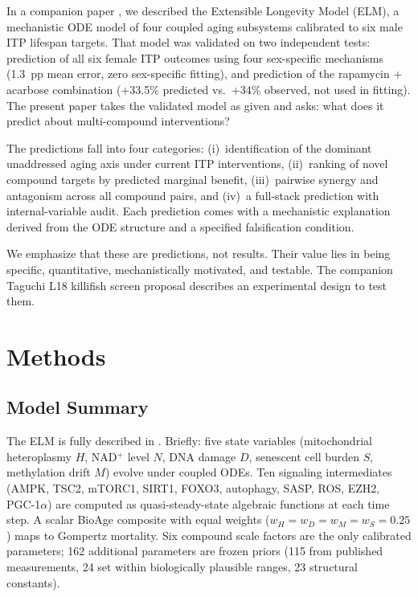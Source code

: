 \documentclass[11pt]{article}
\begin{document}
In a companion paper \citep{Biggs2025elm}, we described the Extensible Longevity Model (ELM), a mechanistic ODE model of four coupled aging subsystems calibrated to six male ITP lifespan targets. That model was validated on two independent tests: prediction of all six female ITP outcomes using four sex-specific mechanisms (1.3~pp mean error, zero sex-specific fitting), and prediction of the rapamycin + acarbose combination (+33.5\% predicted vs.\ +34\% observed, not used in fitting). The present paper takes the validated model as given and asks: what does it predict about multi-compound interventions?

The predictions fall into four categories: (i)~identification of the dominant unaddressed aging axis under current ITP interventions, (ii)~ranking of novel compound targets by predicted marginal benefit, (iii)~pairwise synergy and antagonism across all compound pairs, and (iv)~a full-stack prediction with internal-variable audit. Each prediction comes with a mechanistic explanation derived from the ODE structure and a specified falsification condition.

We emphasize that these are predictions, not results. Their value lies in being specific, quantitative, mechanistically motivated, and testable. The companion Taguchi L18 killifish screen proposal \citep{Biggs2025taguchi} describes an experimental design to test them.

\section{Methods}

\subsection{Model Summary}

The ELM is fully described in \citet{Biggs2025elm}. Briefly: five state variables (mitochondrial heteroplasmy $H$, NAD$^+$ level $N$, DNA damage $D$, senescent cell burden $S$, methylation drift $M$) evolve under coupled ODEs. Ten signaling intermediates (AMPK, TSC2, mTORC1, SIRT1, FOXO3, autophagy, SASP, ROS, EZH2, PGC-1$\alpha$) are computed as quasi-steady-state algebraic functions at each time step. A scalar BioAge composite with equal weights ($w_H = w_D = w_M = w_S = 0.25$) maps to Gompertz mortality. Six compound scale factors are the only calibrated parameters; 162 additional parameters are frozen priors (115 from published measurements, 24 set within biologically plausible ranges, 23 structural constants).
\end{document}
